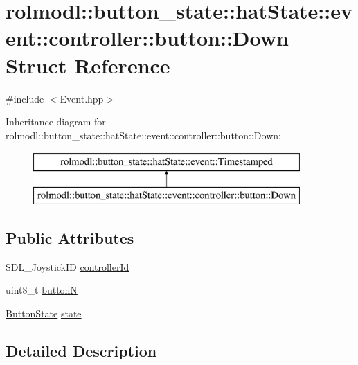 \hypertarget{structrolmodl_1_1button__state_1_1hat_state_1_1event_1_1controller_1_1button_1_1_down}{}\section{rolmodl\+::button\+\_\+state\+::hat\+State\+::event\+::controller\+::button\+::Down Struct Reference}
\label{structrolmodl_1_1button__state_1_1hat_state_1_1event_1_1controller_1_1button_1_1_down}


{\ttfamily \#include $<$Event.\+hpp$>$}

Inheritance diagram for rolmodl\+::button\+\_\+state\+::hat\+State\+::event\+::controller\+::button\+::Down\+:\begin{figure}[H]
\begin{center}
\leavevmode
\includegraphics[height=2.000000cm]{structrolmodl_1_1button__state_1_1hat_state_1_1event_1_1controller_1_1button_1_1_down}
\end{center}
\end{figure}
\subsection*{Public Attributes}
\begin{DoxyCompactItemize}
\item 
S\+D\+L\+\_\+\+Joystick\+ID \mbox{\hyperlink{structrolmodl_1_1button__state_1_1hat_state_1_1event_1_1controller_1_1button_1_1_down_a7ac5f648bb05ffa1faa13872b33b872f}{controller\+Id}}
\item 
uint8\+\_\+t \mbox{\hyperlink{structrolmodl_1_1button__state_1_1hat_state_1_1event_1_1controller_1_1button_1_1_down_a22cd1b3a69477f4aa4dbcc5d566fcb8a}{buttonN}}
\item 
\mbox{\hyperlink{namespacerolmodl_ad08ec5c56aa1db118f871357b2d475fd}{Button\+State}} \mbox{\hyperlink{structrolmodl_1_1button__state_1_1hat_state_1_1event_1_1controller_1_1button_1_1_down_a7b6a9431c2472429ed6acda847514c60}{state}}
\end{DoxyCompactItemize}


\subsection{Detailed Description}



